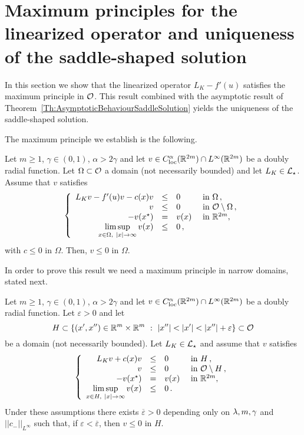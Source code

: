 \section{Maximum principles for the linearized operator and uniqueness of the saddle-shaped solution}
\label{Sec:MaximumPrinciple}

In this section we show that the linearized operator $L_K  -f'(u)$ satisfies the maximum principle in $\mathcal{O}$. This result combined with the asymptotic result of Theorem~\ref{Th:AsymptoticBehaviourSaddleSolution} yields the uniqueness of the saddle-shaped solution.

The maximum principle we establish is the following.

\begin{proposition}
	\label{Prop:MaximumPrincipleInO}
	Let $m\geq 1$, $\gamma \in (0,1)$, $\alpha > 2\gamma$ and let $v\in C^\alpha_{\mathrm{loc}}(\mathbb{R}^{2m})\cap L^\infty(\mathbb{R}^{2m})$ be a doubly radial function. Let $\Omega \subset \mathcal{O}$ a domain (not necessarily bounded) and let $L_K  \in \mathcal{L}_\star$. Assume that $v$ satisfies
	$$
	\left\{\begin{array}{rcll}
	L_K v - f'(u)v - c(x)v &\leq & 0 &\textrm{ in } \Omega\,,\\
	v &\leq & 0 &\textrm{ in } \mathcal{O} \setminus \Omega\,,\\
	- v(x^\star) & = & v(x) &\textrm{ in } \mathbb{R}^{2m},\\
	\displaystyle \limsup_{x\in \Omega, \ |x|\to \infty} v(x) &\leq & 0\,,
	\end{array} \right.
	$$
	with $c\leq 0$ in $\Omega$.
	Then, $v \leq 0$ in $\Omega$.
\end{proposition}

In order to prove this result we need a maximum principle in narrow domains, stated next.

\begin{proposition}
	\label{Prop:MaximumPrincipleNarrowDomainsOdd}
	Let $m\geq 1$, $\gamma \in (0,1)$, $\alpha > 2\gamma$ and let $v\in C^\alpha_{\mathrm{loc}}(\mathbb{R}^{2m})\cap L^\infty(\mathbb{R}^{2m})$ be a doubly radial function. Let $\varepsilon>0$ and let
	$$
	H \subset \{(x',x'')\in \R^m\times\R^m \ : \ |x''|<|x'|<|x''|+ \varepsilon\} \subset \ocal
	$$ 
	be a domain (not necessarily bounded). Let $L_K  \in \mathcal{L}_\star$ and assume that $v$ satisfies
	\begin{equation}
	\label{Eq:AssumptionsMaxPNarrow}
	\left\{\begin{array}{rcll}
	L_K v + c(x)v&\leq & 0 &\textrm{ in } H\,,\\
	v &\leq & 0 &\textrm{ in } \mathcal{O} \setminus H\,,\\
	- v(x^\star) & = & v(x) &\textrm{ in } \mathbb{R}^{2m},\\
	\displaystyle \limsup_{x\in H, \ |x|\to \infty} v(x) &\leq & 0\,.
	\end{array} \right.
	\end{equation}
	Under these assumptions there exists $\overline{\varepsilon}>0$ depending only on $\lambda, m, \gamma$ and $||c_-||_{L^\infty}$ such that, if $\varepsilon<\overline{\varepsilon}$, then $v \leq 0$ in $H$.
\end{proposition}

